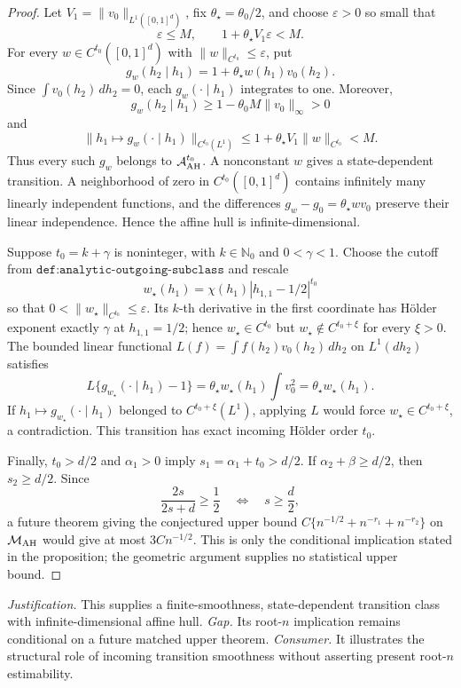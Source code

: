 \documentclass{article}
\begin{document}
\begin{proof}
Let \(V_1=\|v_0\|_{L^1([0,1]^d)}\), fix \(\theta_\star=\theta_0/2\), and choose \(\varepsilon>0\) so small that
\[\varepsilon\le M,\qquad 1+\theta_\star V_1\varepsilon<M.\]
For every \(w\in C^{t_0}([0,1]^d)\) with \(\|w\|_{C^{t_0}}\le\varepsilon\), put
\[g_w(h_2\mid h_1)=1+\theta_\star w(h_1)v_0(h_2).\]
Since \(\int v_0(h_2)\,dh_2=0\), each \(g_w(\cdot\mid h_1)\) integrates to one. Moreover,
\[g_w(h_2\mid h_1)\ge1-\theta_0M\|v_0\|_\infty>0\]
and
\[\|h_1\mapsto g_w(\cdot\mid h_1)\|_{C^{t_0}(L^1)}\le1+\theta_\star V_1\|w\|_{C^{t_0}}<M.\]
Thus every such \(g_w\) belongs to \(\mathcal A_{\rm AH}^{t_0}\). A nonconstant \(w\) gives a state-dependent transition. A neighborhood of zero in \(C^{t_0}([0,1]^d)\) contains infinitely many linearly independent functions, and the differences \(g_w-g_0=\theta_\star wv_0\) preserve their linear independence. Hence the affine hull is infinite-dimensional.

Suppose \(t_0=k+\gamma\) is noninteger, with \(k\in\mathbb N_0\) and \(0<\gamma<1\). Choose the cutoff from \(\texttt{def:analytic-outgoing-subclass}\) and rescale
\[w_\star(h_1)=\chi(h_1)|h_{1,1}-1/2|^{t_0}\]
so that \(0<\|w_\star\|_{C^{t_0}}\le\varepsilon\). Its \(k\)-th derivative in the first coordinate has H\"older exponent exactly \(\gamma\) at \(h_{1,1}=1/2\); hence \(w_\star\in C^{t_0}\) but \(w_\star\notin C^{t_0+\xi}\) for every \(\xi>0\). The bounded linear functional \(L(f)=\int f(h_2)v_0(h_2)\,dh_2\) on \(L^1(dh_2)\) satisfies
\[L\{g_{w_\star}(\cdot\mid h_1)-1\}=\theta_\star w_\star(h_1)\int v_0^2=\theta_\star w_\star(h_1).\]
If \(h_1\mapsto g_{w_\star}(\cdot\mid h_1)\) belonged to \(C^{t_0+\xi}(L^1)\), applying \(L\) would force \(w_\star\in C^{t_0+\xi}\), a contradiction. This transition has exact incoming H\"older order \(t_0\).

Finally, \(t_0>d/2\) and \(\alpha_1>0\) imply \(s_1=\alpha_1+t_0>d/2\). If \(\alpha_2+\beta\ge d/2\), then \(s_2\ge d/2\). Since
\[\frac{2s}{2s+d}\ge\frac12\quad\Longleftrightarrow\quad s\ge\frac d2,\]
a future theorem giving the conjectured upper bound \(C\{n^{-1/2}+n^{-r_1}+n^{-r_2}\}\) on \(\mathcal M_{\rm AH}\) would give at most \(3Cn^{-1/2}\). This is only the conditional implication stated in the proposition; the geometric argument supplies no statistical upper bound.
\end{proof}
\par\smallskip\noindent \textit{Justification.} This supplies a finite-smoothness, state-dependent transition class with infinite-dimensional affine hull. \textit{Gap.} Its root-\(n\) implication remains conditional on a future matched upper theorem. \textit{Consumer.} It illustrates the structural role of incoming transition smoothness without asserting present root-\(n\) estimability.
\end{document}
